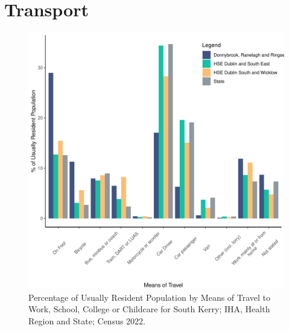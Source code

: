 \documentclass{article}
\begin{document}
\section{Transport}\label{sect:Trans}
\begin{figure}[H]
	\centering
	\includegraphics[width = 120mm]{../figures/TravelED.pdf}
	\caption{Percentage of Usually Resident Population by Means of Travel to Work, School, College or Childcare for South Kerry; IHA, Health Region and State; Census 2022.}
	\label{fig:vbnv}
	\end{figure}
\end{document}
